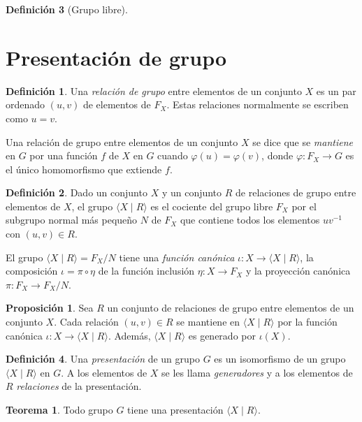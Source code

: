 \documentclass[12pt]{book}
\theoremstyle{definition}
\newtheorem{defi}{Definición}[section]
\newtheorem{teor}{Teorema}[section]
\newtheorem{prop}{Proposición}[section]
\begin{document}
\begin{defi}[Grupo libre]
\section{Presentación de grupo}

\begin{defi}
Una \textit{relación de grupo} entre elementos de un conjunto $X$ es un par ordenado $(u,v)$ de elementos de $F_X$. Estas relaciones normalmente se escriben como $u=v$.
\end{defi}

Una relación de grupo entre elementos de un conjunto $X$ se dice que se \textit{mantiene} en $G$ por una función $f$ de $X$ en $G$ cuando $\varphi(u)=\varphi(v)$, donde $\varphi:F_X\rightarrow G$ es el único homomorfismo que extiende $f$.

\begin{defi}
\label{defi:presen}
Dado un conjunto $X$ y un conjunto $R$ de relaciones de grupo entre elementos de $X$, el grupo $\langle X\mid R \rangle$ es el cociente del grupo libre $F_X$ por el subgrupo normal más pequeño $N$ de $F_X$ que contiene todos los elementos $uv^{-1}$ con $(u,v)\in R$.
\end{defi}

El grupo $\langle X\mid R \rangle = F_X/N$ tiene una \textit{función canónica} $\iota:X\rightarrow \langle X\mid R \rangle$, la composición $\iota =\pi\circ\eta$ de la función inclusión $\eta:X\rightarrow F_X$ y la proyección canónica $\pi:F_X\rightarrow F_X/N$.
\begin{prop}
Sea $R$ un conjunto de relaciones de grupo entre elementos de un conjunto $X$. Cada relación $(u,v)\in R$ se mantiene en $\langle X\mid R \rangle$ por la función canónica $\iota:X\rightarrow\langle X\mid R \rangle$. Además, $\langle X\mid R \rangle$ es generado por $\iota(X)$.
\end{prop}

\end{defi}

\begin{defi}
Una \textit{presentación} de un grupo $G$ es un isomorfismo de un grupo $\langle X\mid R \rangle$ en $G$. A los elementos de $X$ se les llama \textit{generadores} y a los elementos de $R$ \textit{relaciones} de la presentación.
\end{defi}

\begin{teor}
Todo grupo $G$ tiene una presentación $\langle X\mid R \rangle$.
\end{teor}
\end{document}
